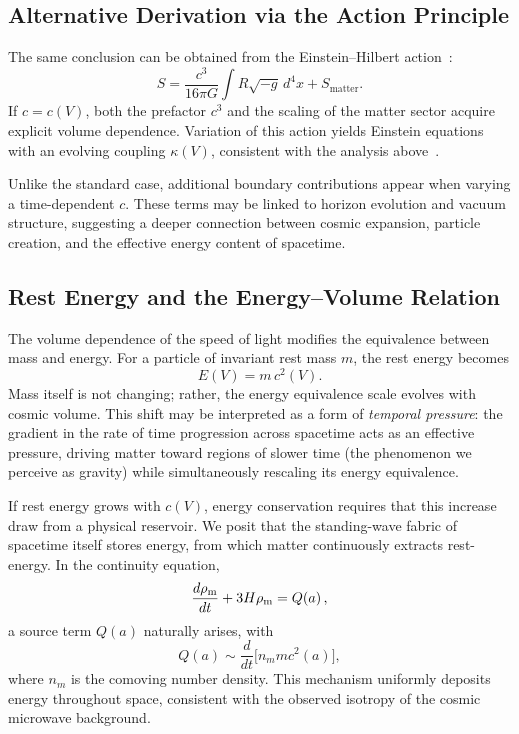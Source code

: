 \documentclass[12pt]{article}
\begin{document}
\subsection{Alternative Derivation via the Action Principle}

The same conclusion can be obtained from the Einstein–Hilbert action~\cite{waldGR1984,Carroll2004}:
\begin{equation}
  S = \frac{c^3}{16 \pi G} \int R \sqrt{-g} \, d^4x + S_{\text{matter}}.
\end{equation}
If \(c = c(V)\), both the prefactor \(c^3\) and the scaling of the matter sector acquire explicit volume dependence. Variation of this action yields Einstein equations with an evolving coupling \(\kappa(V)\), consistent with the analysis above~\cite{albrecht1999}.

Unlike the standard case, additional boundary contributions appear when varying a time-dependent \(c\). These terms may be linked to horizon evolution and vacuum structure, suggesting a deeper connection between cosmic expansion, particle creation, and the effective energy content of spacetime.

\subsection{Rest Energy and the Energy--Volume Relation}

The volume dependence of the speed of light modifies the equivalence between mass and energy. For a particle of invariant rest mass \(m\), the rest energy becomes
\begin{equation}
  E(V) = m \, c^2(V).
\end{equation}
Mass itself is not changing; rather, the energy equivalence scale evolves with cosmic volume. This shift may be interpreted as a form of \emph{temporal pressure}: the gradient in the rate of time progression across spacetime acts as an effective pressure, driving matter toward regions of slower time (the phenomenon we perceive as gravity) while simultaneously rescaling its energy equivalence.

If rest energy grows with \(c(V)\), energy conservation requires that this increase draw from a physical reservoir. We posit that the standing-wave fabric of spacetime itself stores energy, from which matter continuously extracts rest-energy. In the continuity equation,
\begin{equation}
\frac{d\rho_{\rm m}}{dt} + 3 H \rho_{\rm m} = Q(a) \, ,
\end{equation}
a source term \(Q(a)\) naturally arises, with
\begin{equation}
Q(a) \sim \frac{d}{dt}\big[n_m m c^2(a)\big],
\end{equation}
where \(n_m\) is the comoving number density. This mechanism uniformly deposits energy throughout space, consistent with the observed isotropy of the cosmic microwave background.
\end{document}
